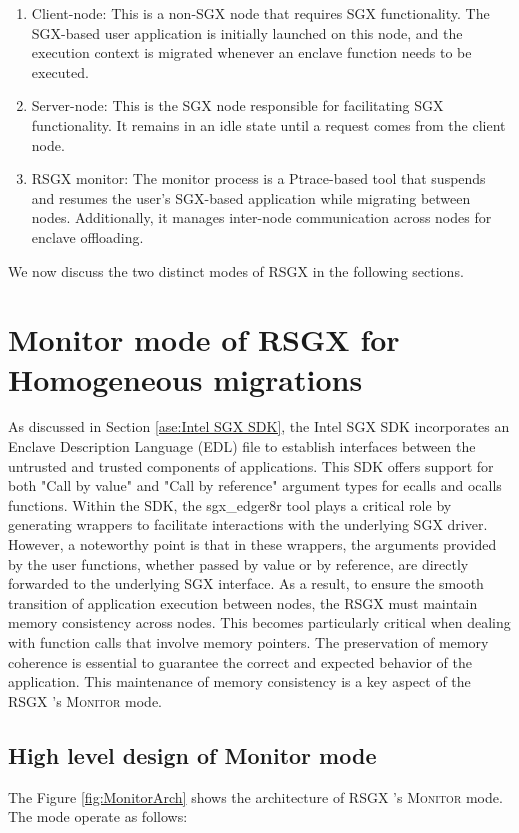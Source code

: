 \documentclass[article, doublespace,nopageskip]{VTthesis} %
\newcommand{\monitor}{RSGX \xspace}
\begin{document}
    \begin{enumerate}
        \item Client-node: This is a non-SGX node that requires SGX functionality. The SGX-based user application is initially launched on this node, and the execution context is migrated whenever an enclave function needs to be executed.
        \item Server-node: This is the SGX node responsible for facilitating SGX functionality. It remains in an idle state until a request comes from the client node.
        \item \monitor monitor: The monitor process is a Ptrace-based tool that suspends and resumes the user's SGX-based application while migrating between nodes. Additionally, it manages inter-node communication across nodes for enclave offloading. 
    \end{enumerate}
    
    We now discuss the two distinct modes of \monitor in the following sections. 

    \section{Monitor mode of \monitor for Homogeneous migrations} \label{ase: Monitor mode}
    As discussed in Section \ref{ase:Intel SGX SDK}, the Intel SGX SDK incorporates an Enclave Description Language (EDL) file to establish interfaces between the untrusted and trusted components of applications. This SDK offers support for both "Call by value" and "Call by reference" argument types for ecalls and ocalls functions. Within the SDK, the sgx\_edger8r tool plays a critical role by generating wrappers to facilitate interactions with the underlying SGX driver. However, a noteworthy point is that in these wrappers, the arguments provided by the user functions, whether passed by value or by reference, are directly forwarded to the underlying SGX interface. As a result, to ensure the smooth transition of application execution between nodes, the \monitor must maintain memory consistency across nodes. This becomes particularly critical when dealing with function calls that involve memory pointers. The preservation of memory coherence is essential to guarantee the correct and expected behavior of the application. This maintenance of memory consistency is a key aspect of the \monitor's \textsc{Monitor} mode.

    \subsection{High level design of Monitor mode} \label{ase: highlevel_design_monitor}
    The Figure \ref{fig:MonitorArch} shows the architecture of \monitor's \textsc{Monitor} mode. The mode operate as follows:
\end{document}

